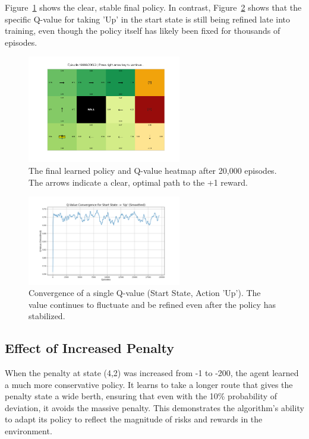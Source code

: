 \documentclass{article}
\begin{document}
Figure~\ref{fig:policy_heatmap} shows the clear, stable final policy. In contrast, Figure~\ref{fig:q_convergence} shows that the specific Q-value for taking 'Up' in the start state is still being refined late into training, even though the policy itself has likely been fixed for thousands of episodes.

\begin{figure}[H]
    \centering
    \includegraphics[width=0.6\textwidth]{../results/qpolicy_visualizatoin_heatmapt.png}
    \caption{The final learned policy and Q-value heatmap after 20,000 episodes. The arrows indicate a clear, optimal path to the +1 reward.}
    \label{fig:policy_heatmap}
\end{figure}

\begin{figure}[H]
    \centering
    \includegraphics[width=0.6\textwidth]{../results/qvalue_vs_episodes.png}
    \caption{Convergence of a single Q-value (Start State, Action 'Up'). The value continues to fluctuate and be refined even after the policy has stabilized.}
    \label{fig:q_convergence}
\end{figure}

\subsection{Effect of Increased Penalty}
When the penalty at state (4,2) was increased from -1 to -200, the agent learned a much more conservative policy. It learns to take a longer route that gives the penalty state a wide berth, ensuring that even with the 10\% probability of deviation, it avoids the massive penalty. This demonstrates the algorithm's ability to adapt its policy to reflect the magnitude of risks and rewards in the environment.
\end{document}
